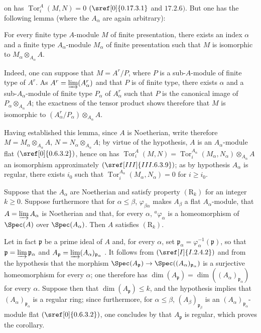 on has $\operatorname{Tor}_i^A(M,N)=0$ $(\sref[0]{0.17.3.1}$ and $17.2.6)$.
But one has the following lemma (where the $A_\alpha$ are again arbitrary):

\begin{lemma}[5.13.7.1]
\label{IV.5.13.7.1}
For every finite type $A$-module $M$ of finite presentation, there exists an index $\alpha$ and a finite type $A_\alpha$-module $M_\alpha$ of finite presentation such that $M$ is isomorphic to $M_\alpha\otimes_{A_\alpha}A$.
\end{lemma}

Indeed, one can suppose that $M=A^r/P$, where $P$ is a sub-$A$-module of finite type of $A^r$.
As $A^r=\varinjlim(A_\alpha^r)$ and that $P$ is of finite type, there exists $\alpha$ and a sub-$A_\alpha$-module of finite type $P_\alpha$ of $A_\alpha^r$ such that $P$ is the canonical image of $P_\alpha\otimes_{A_\alpha}A$; the exactness of the tensor product shows therefore that $M$ is isomorphic to $(A_\alpha^r/P_\alpha)\otimes_{A_\alpha}A$.

Having established this lemma, since $A$ is Noetherian, write therefore $M=M_\alpha\otimes_{A_\alpha}A$, $N=N_\alpha\otimes_{A_\alpha}A$; by virtue of the hypothesis, $A$ is an $A_\alpha$-module flat $(\sref[0]{0.6.3.2})$, hence on has $\operatorname{Tor}_i^A(M,N)=\operatorname{Tor}_i^{A_\alpha}(M_\alpha,N_\alpha)\otimes_{A_\alpha}A$ an isomorphism approximately $(\sref[III]{III.6.3.9})$; as by hypothesis $A_\alpha$ is regular, there exists $i_0$ such that $\operatorname{Tor}_i^{A_\alpha}(M_\alpha,N_\alpha)=0$ for $i\geqslant i_0$.

\begin{corollary}[5.13.8]
\label{IV.5.13.8}
Suppose that the $A_\alpha$ are Noetherian and satisfy property $(\mathrm{R}_k)$ for an integer $k\geqslant 0$.
Suppose furthermore that for $\alpha\leqslant\beta$, $\varphi_{\beta\alpha}$ makes $A_\beta$ a flat $A_\alpha$-module, that $A=\varinjlim A_\alpha$ is Noetherian and that, for every $\alpha$, ${}^a\!\varphi_\alpha$ is a homeomorphism of $\Spec(A)$ over $\Spec(A_\alpha)$.
Then $A$ satisfies $(\mathrm{R}_k)$.
\end{corollary}

Let in fact $\mathfrak{p}$ be a prime ideal of $A$ and, for every $\alpha$, set $\mathfrak{p}_\alpha=\varphi_\alpha^{-1}(\mathfrak{p})$, so that $\mathfrak{p}=\varinjlim\mathfrak{p}_\alpha$ and $A_\mathfrak{p}=\varinjlim(A_\alpha)_{\mathfrak{p}_\alpha}$ .
It follows from $(\sref[I]{I.2.4.2})$ and from the hypothesis that the morphism $\Spec(A_\mathfrak{p})\to\Spec((A_\alpha)_{\mathfrak{p}_\alpha})$ is a surjective homeomorphism for every $\alpha$; one therefore has $\dim(A_\mathfrak{p})=\dim((A_\alpha)_{\mathfrak{p}_\alpha})$ for every $\alpha$.
Suppose then that $\dim(A_\mathfrak{p})\leqslant k$, and the hypothesis implies that $(A_\alpha)_{\mathfrak{p}_\alpha}$ is a regular ring; since furthermore, for $\alpha\leqslant\beta$, $(A_\beta)_{\mathfrak{p}_\beta}$ is an $(A_\alpha)_{\mathfrak{p}_\alpha}$-module flat $(\sref[0]{0.6.3.2})$, one concludes by  that $A_\mathfrak{p}$ is regular, which proves the corollary.
